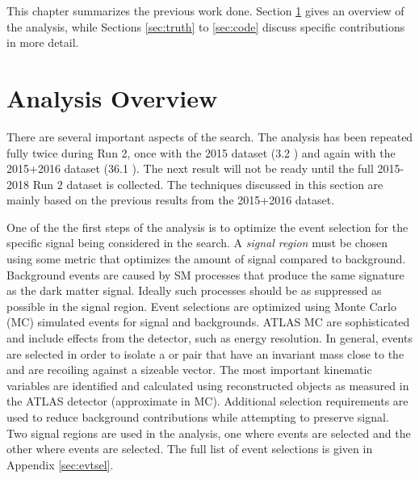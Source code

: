 \label{chapter:prevWork}

This chapter summarizes the previous work done. Section \ref{sec:analysis} gives an overview of the analysis, while Sections \ref{sec:truth} to \ref{sec:code} discuss specific contributions in more detail.

\section{Analysis Overview}
\label{sec:analysis}

There are several important aspects of the \monoZ search. The analysis has been repeated fully twice during Run 2, once with the 2015 dataset (3.2 \ifb) and again with the 2015+2016 dataset (36.1 \ifb). The next result will not be ready until the full 2015-2018 Run 2 dataset is collected. The techniques discussed in this section are mainly based on the previous results from the 2015+2016 dataset. 

One of the the first steps of the analysis is to optimize the event selection for the specific signal being considered in the search. A \textit{signal region} must be chosen using some metric that optimizes the amount of signal compared to background. Background events are caused by SM processes that produce the same signature as the dark matter signal. Ideally such processes should be as suppressed as possible in the signal region. Event selections are optimized using Monte Carlo (MC) simulated events for signal and backgrounds. ATLAS MC are sophisticated and include effects from the detector, such as energy resolution. In general, events are selected in order to isolate a \epem or \mpmm pair that have an invariant mass close to the \Z and are recoiling against a sizeable \etmiss vector. The most important kinematic variables are identified and calculated using reconstructed objects as measured in the ATLAS detector (approximate in MC). Additional selection requirements are used to reduce background contributions while attempting to preserve signal. Two signal regions are used in the \monoZ analysis, one where \epem events are selected and the other where \mpmm events are selected. The full list of event selections is given in Appendix \ref{sec:evtsel}.

